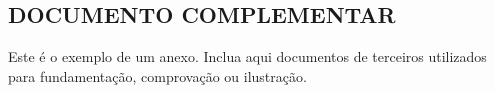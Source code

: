 
\begin{anexosenv}

\chapter{DOCUMENTO COMPLEMENTAR}

Este é o exemplo de um anexo. Inclua aqui documentos de terceiros utilizados para fundamentação, comprovação ou ilustração.

\end{anexosenv}
